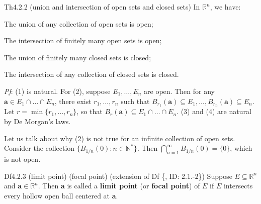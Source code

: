 \documentclass{article}
\begin{document}
\begin{Th}{Th4.2.2 (union and intersection of open sets and closed sets)}
    In $\mathbb{R}^n$, we have:
    \begin{compactenum}
        \item The union of any collection of open sets is open;
        \item The intersection of finitely many open sets is open;
        \item The union of finitely many closed sets is closed;
        \item The intersection of any collection of closed sets is closed.
    \end{compactenum}
    \tcblower
    \textit{Pf}: (1) is natural. For (2), suppose $E_1, \dots, E_n$ are open. Then for any $\pmb{a}\in E_1\cap\dots\cap E_n$, there exist $r_1, \dots, r_n$ such that $B_{r_1}(\pmb{a})\subseteq E_1, \dots, B_{r_n}(\pmb{a})\subseteq E_n$. Let $r = \min\{r_1, \dots, r_n\}$, so that $B_r(\pmb{a})\subseteq E_1\cap\dots\cap E_n$. (3) and (4) are natural by De Morgan's laws. 
\end{Th}

\begin{Rmk}{}
    Let us talk about why (2) is not true for an infinite collection of open sets. Consider the collection $\{B_{1/n}(0): n\in\mathbb{N}^\ast\}$. Then $\bigcap\limits_{n=1}^\infty B_{1/n}(0) = \{0\}$, which is not open.
\end{Rmk}

\begin{Df}{Df4.2.3 (limit point) (focal point) (extension of Df \{, ID: 2.1.-2\})}
    Suppose $E\subseteq\mathbb{R}^n$ and $\pmb{a}\in\mathbb{R}^n$. Then $\pmb{a}$ is called a \textbf{limit point} (or \textbf{focal point}) of $E$ if $E$ intersects every hollow open ball centered at $\pmb{a}$.
\end{Df}
    
\end{document}
